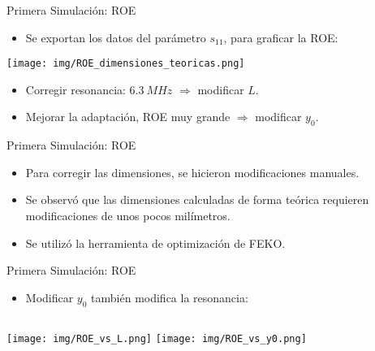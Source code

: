 \begin{frame}{Primera Simulación: ROE}

\begin{itemize}
    \item Se exportan los datos del parámetro $s_{11}$, para graficar la ROE:
\end{itemize}

\begin{center}
    \texttt{[image: img/ROE\_dimensiones\_teoricas.png]}
\end{center}

\begin{itemize}
    \item<2-> Corregir resonancia: $6.3 \ MHz$ $\Rightarrow$ modificar $L$.
    \item<3-> Mejorar la adaptación, ROE muy grande $\Rightarrow$ modificar $y_0$.
\end{itemize}
    
\end{frame}

\begin{frame}{Primera Simulación: ROE}
    \begin{itemize}[<+->]
        \item Para corregir las dimensiones, se hicieron modificaciones manuales.
        \item Se observó que las dimensiones calculadas de forma teórica requieren modificaciones de unos pocos milímetros.
        \item Se utilizó la herramienta de optimización de FEKO.
    \end{itemize}
\end{frame}

\begin{frame}{Primera Simulación: ROE}
    \begin{itemize}
        \item<1-> Modificar $y_0$ también modifica la resonancia:
    \end{itemize}
    \vspace{1cm}
    \begin{columns}
            \texttt{[image: img/ROE\_vs\_L.png]}
            \texttt{[image: img/ROE\_vs\_y0.png]}
    \end{columns}
    
\end{frame}

